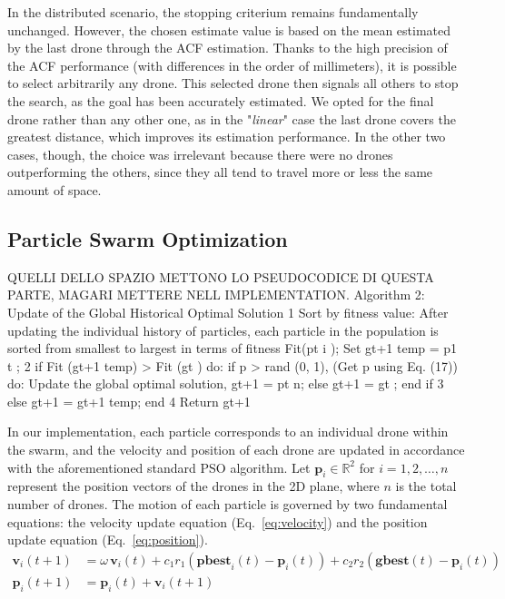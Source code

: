 In the distributed scenario, the stopping criterium remains fundamentally unchanged. However, the chosen estimate value is based on the mean estimated by the last drone through the ACF estimation. Thanks to the high precision of the ACF performance (with differences in the order of millimeters), it is possible to select arbitrarily any drone. This selected drone then signals all others to stop the search, as the goal has been accurately estimated. We opted for the final drone rather than any other one, as in the "\textit{linear}" case the last drone covers the greatest distance, which improves its estimation performance. In the other two cases, though, the choice was irrelevant because there were no drones outperforming the others, since they all tend to travel more or less the same amount of space.

\subsection{Particle Swarm Optimization}
QUELLI DELLO SPAZIO METTONO LO PSEUDOCODICE DI QUESTA PARTE,
MAGARI METTERE NELL IMPLEMENTATION.
Algorithm 2: Update of the Global Historical Optimal
Solution
1 Sort by fitness value: After updating the individual history of
particles, each particle in the population is sorted from smallest to
largest in terms of fitness Fit(pt
i
);
Set gt+1
temp = p1
t
;
2 if Fit (gt+1
temp) > Fit (gt
) do:
if p > rand (0, 1), (Get p using Eq. (17)) do:
Update the global optimal solution, gt+1 = pt
n;
else gt+1 = gt
;
end if
3 else gt+1 = gt+1
temp;
end
4 Return gt+1


\par In our implementation, each particle corresponds to an individual drone 
within the swarm, and the velocity and position of each drone are updated in 
accordance with the aforementioned standard PSO algorithm. Let $\mathbf{p}_i \in \mathbb{R}^2$ 
for $i = 1, 2, \dots, n$ represent the position vectors of the drones in the 2D plane, 
where $n$ is the total number of drones. The motion of each particle is governed 
by two fundamental equations: the velocity update equation (Eq.~\ref{eq:velocity}) and 
the position update equation (Eq.~\ref{eq:position}).
\begin{align}
    \mathbf{v}_{i}(t+1) &= \omega \, \mathbf{v}_{i}(t) + c_1 r_1 \left( \mathbf{pbest}_{i}(t) - \mathbf{p}_{i}(t) \right) 
    + c_2 r_2 \left( \mathbf{gbest}(t) - \mathbf{p}_{i}(t) \right) \label{eq:velocity} \\
    \mathbf{p}_{i}(t+1) &= \mathbf{p}_{i}(t) + \mathbf{v}_{i}(t+1) \label{eq:position}
\end{align}
    
